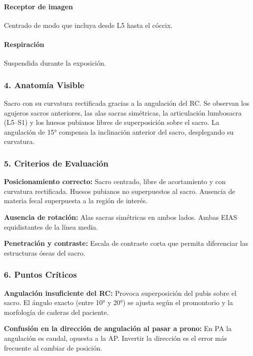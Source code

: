 	\paragraph{Receptor de imagen}
	Centrado de modo que incluya desde L5 hasta el cóccix.
	
	\paragraph{Respiración}
	Suspendida durante la exposición.
	
	\subsubsection*{4. Anatomía Visible}
	
	Sacro con su curvatura rectificada gracias a la angulación del RC. Se observan los agujeros sacros anteriores, las alas sacras simétricas, la articulación lumbosacra (L5--S1) y los huesos pubianos libres de superposición sobre el sacro. La angulación de 15° compensa la inclinación anterior del sacro, desplegando su curvatura.
	
	\subsubsection*{5. Criterios de Evaluación}
	
	\textbf{Posicionamiento correcto:} Sacro centrado, libre de acortamiento y con curvatura rectificada. Huesos pubianos no superpuestos al sacro. Ausencia de materia fecal superpuesta a la región de interés.
	
	\textbf{Ausencia de rotación:} Alas sacras simétricas en ambos lados. Ambas EIAS equidistantes de la línea media.
	
	\textbf{Penetración y contraste:} Escala de contraste corta que permita diferenciar las estructuras óseas del sacro.
	
	\subsubsection*{6. Puntos Críticos}
	
	\textbf{Angulación insuficiente del RC:} Provoca superposición del pubis sobre el sacro. El ángulo exacto (entre 10° y 20°) se ajusta según el promontorio y la morfología de caderas del paciente.
	
	\textbf{Confusión en la dirección de angulación al pasar a prono:} En PA la angulación es caudal, opuesta a la AP. Invertir la dirección es el error más frecuente al cambiar de posición.
	
